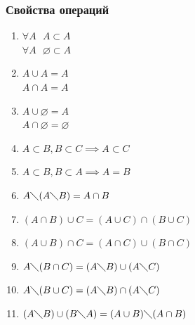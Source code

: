 \documentclass[12pt]{article}
\begin{document}
    \subsubsection*{Свойства операций}
    \begin{enumerate}
        \item $\forall A \text{ } A \subset A$\\$\forall A \text { } \varnothing \subset A$
        \item $A \cup A = A$\\$A \cap A = A$
        \item $A \cup \varnothing = A$\\$A \cap \varnothing = \varnothing$
        \item $A \subset B, B \subset C \implies A \subset C$
        \item $A \subset B, B \subset A \implies A = B$
        \item $A \diagdown (A \diagdown B) = A \cap B$
        \item $(A \cap B) \cup C = (A \cup C) \cap (B \cup C)$
        \item $(A \cup B) \cap C = (A \cap C) \cup (B \cap C)$
        \item $A \diagdown (B \cap C) = (A \diagdown B) \cup (A \diagdown C)$
        \item $A \diagdown (B \cup C) = (A \diagdown B) \cap (A \diagdown C)$
        \item $(A \diagdown B) \cup (B \diagdown A) = (A \cup B) \diagdown (A \cap B)$
    \end{enumerate}
    \par
\end{document}
